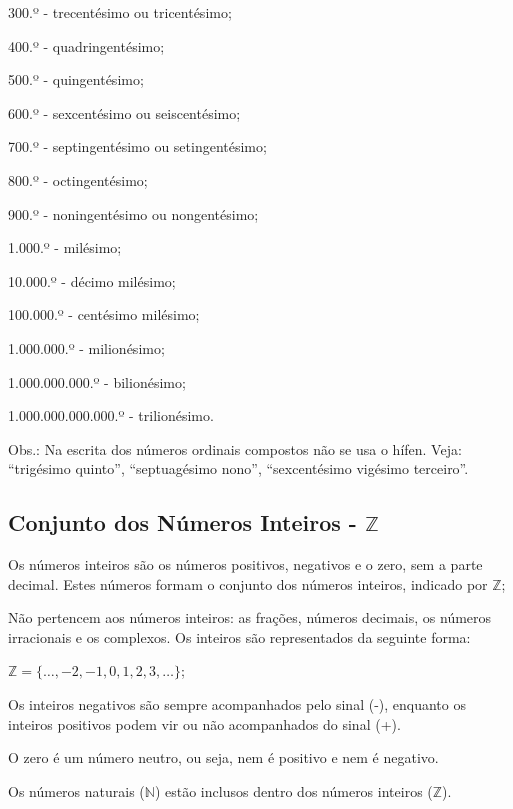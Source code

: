 \begin{multicols*}{2}
\begin{enumerate}
              300.º - trecentésimo ou tricentésimo;

              400.º - quadringentésimo;

              500.º - quingentésimo;

              600.º - sexcentésimo ou seiscentésimo;

              700.º - septingentésimo ou setingentésimo;

              800.º - octingentésimo;

              900.º - noningentésimo ou nongentésimo;

              1.000.º - milésimo;

              10.000.º - décimo milésimo;

              100.000.º - centésimo milésimo;

              1.000.000.º - milionésimo;

              1.000.000.000.º - bilionésimo;

              1.000.000.000.000.º - trilionésimo.

              Obs.: Na escrita dos números ordinais compostos não se usa o hífen. Veja: “trigésimo quinto”, “septuagésimo nono”, “sexcentésimo vigésimo terceiro”.

    \end{enumerate}

    \subsection{Conjunto dos Números Inteiros - $\mathbb{Z}$}

    Os números inteiros são os números positivos, negativos e o zero, sem a parte decimal. Estes números formam o conjunto dos números inteiros, indicado por $\mathbb{Z}$;

    Não pertencem aos números inteiros: as frações, números decimais, os números irracionais e os complexos. Os inteiros são representados da seguinte forma:

    $\mathbb{Z} = \{{\dots, -2, -1, 0, 1, 2, 3, \dots\}}$;

    Os inteiros negativos são sempre acompanhados pelo sinal (-), enquanto os inteiros positivos podem vir ou não acompanhados do sinal (+).

    O zero é um número neutro, ou seja, nem é positivo e nem é negativo.

    Os números naturais ($\mathbb{N}$) estão inclusos dentro dos números inteiros ($\mathbb{Z}$).


\end{multicols*}
